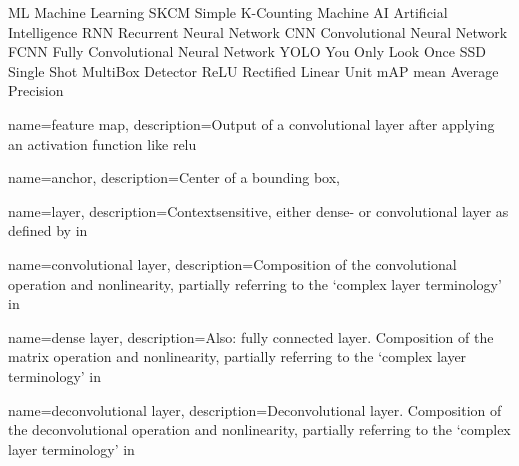 
 {ML} {Machine Learning}
 {SKCM} {Simple K-Counting Machine}
 {AI} {Artificial Intelligence}
 {RNN} {Recurrent Neural Network}
 {CNN} {Convolutional Neural Network}
 {FCNN} {Fully Convolutional Neural Network}
 {YOLO} {You Only Look Once}
 {SSD} {Single Shot MultiBox Detector}
 {ReLU} {Rectified Linear Unit}
 {mAP} {mean Average Precision}




 {
    name={feature map},
    description={Output of a convolutional layer after applying an activation function like \gls{relu}}
}

 {
    name={anchor},
    description={Center of a bounding box},
}

 {
    name={layer},
    description={Contextsensitive, either dense- or \gls{convolutional layer} 
    as defined by in}}

 {
    name={convolutional layer},
    description={Composition of the convolutional operation and nonlinearity, 
    partially referring to the `complex layer terminology' 
    in~\cite[341]{Goodfellow.2016}}
}

 {
    name={dense layer},
    description={Also: fully connected layer. Composition of the matrix operation and nonlinearity, partially referring to the `complex layer terminology' 
    in~\cite[341]{Goodfellow.2016}} 
}

 {
    name={deconvolutional layer},
    description={Deconvolutional layer. Composition of the deconvolutional 
    operation and nonlinearity, partially referring to the `complex layer 
    terminology' 
    in~\cite[341]{Goodfellow.2016}} 
}
